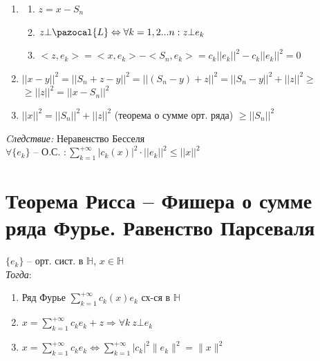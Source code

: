 \documentclass[paper=a4, fontsize=17pt]{article}
\begin{document}
\begin{enumerate}

	\item
	\begin{enumerate}
		\item $z = x - S_n$

		\item $z \bot \pazocal{L} \Leftrightarrow \forall k = 1, 2 ...n : z \bot e_k$

		\item $<z, e_k> = <x, e_k> - <S_n, e_k> = c_k ||e_k||^2 - c_k ||e_k||^2 = 0$
	\end{enumerate}

	\item $||x - y||^2 = ||S_n + z - y||^2 = ||(S_n - y) + z||^2 = ||S_n - y||^2 + ||z||^2 \geqslant$ $\geqslant ||z||^2 = ||x - S_n||^2$

	\item $||x||^2 = ||S_n||^2 + ||z||^2$ (теорема о сумме орт. ряда) $\geqslant ||S_n||^2$
\end{enumerate}

\emph{Cледствие:} Неравенство Бесселя\\

$\forall \{e_k\}$ {{--}} О.С. $:\sum\limits_{k=1}^{+\infty} |c_k(x)|^2 \cdot ||e_k||^2 \leqslant ||x||^2$

\section{Теорема Рисса -- Фишера о сумме ряда Фурье. Равенство Парсеваля}
$\{e_k\}$ -- орт. сист. в $\mathds{H}$, $x \in \mathds{H}$\\

\emph{Тогда}:
\begin{enumerate}
	\item Ряд Фурье $\sum\limits_{k=1}^{+\infty} c_k(x) e_k$ сх-ся в $\mathds{H}$
	\item $x =\sum\limits_{k=1}^{+\infty} c_k e_k + z \Rightarrow \forall k \ z \bot e_k$
	\item $x =\sum\limits_{k=1}^{+\infty} c_k e_k \Leftrightarrow \sum\limits_{k=1}^{+\infty} \vert c_k \vert^2 \|e_k\|^2=\|x\|^2$
\end{enumerate}
\end{document}
